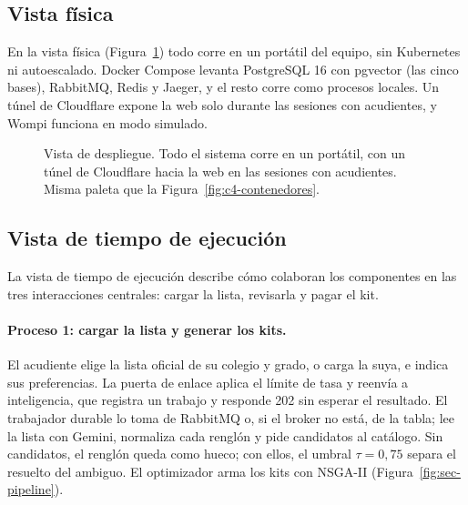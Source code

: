 \subsection{Vista física}
\label{sec:vista-fisica}

En la vista física (Figura~\ref{fig:despliegue}) todo corre en un portátil del equipo, sin Kubernetes ni autoescalado. Docker Compose levanta PostgreSQL 16 con pgvector (las cinco bases), RabbitMQ, Redis y Jaeger, y el resto corre como procesos locales. Un túnel de Cloudflare expone la web solo durante las sesiones con acudientes, y Wompi funciona en modo simulado.

\begin{figure}[!htb]
\centering
\resizebox{0.6\textwidth}{!}{}
\caption[Vista de despliegue: cómo corre Tukit en el equipo.]{Vista de despliegue. Todo el
sistema corre en un portátil, con un túnel de Cloudflare hacia la web en las sesiones con acudientes.
Misma paleta que la Figura~\ref{fig:c4-contenedores}.}
\label{fig:despliegue}
\end{figure}

\subsection{Vista de tiempo de ejecución}
\label{sec:proceso}
\label{sec:vista-procesos}

La vista de tiempo de ejecución describe cómo colaboran los componentes en las tres interacciones centrales: cargar la lista, revisarla y pagar el kit.

\paragraph{Proceso 1: cargar la lista y generar los kits.} El acudiente elige la lista oficial de su colegio y grado, o carga la suya, e indica sus preferencias. La puerta de enlace aplica el límite de tasa y reenvía a inteligencia, que registra un trabajo y responde 202 sin esperar el resultado. El trabajador durable lo toma de RabbitMQ o, si el broker no está, de la tabla; lee la lista con Gemini, normaliza cada renglón y pide candidatos al catálogo. Sin candidatos, el renglón queda como hueco; con ellos, el umbral $\tau = 0{,}75$ separa el resuelto del ambiguo. El optimizador arma los kits con NSGA-II (Figura~\ref{fig:sec-pipeline}).

